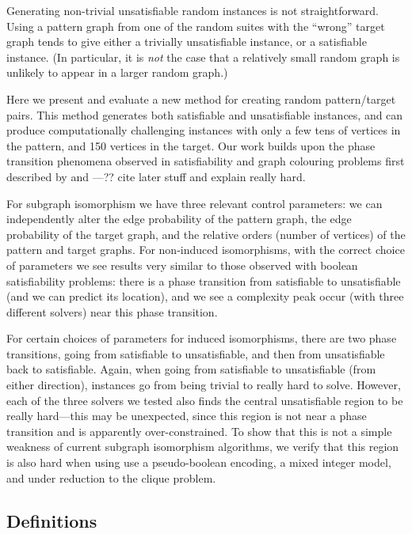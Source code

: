 \documentclass[letterpaper]{article}
\begin{document}
Generating non-trivial unsatisfiable random instances is not straightforward. Using a
pattern graph from one of the random suites with the ``wrong'' target graph tends to give either a
trivially unsatisfiable instance, or a satisfiable instance. (In particular, it is \emph{not} the
case that a relatively small random graph is unlikely to appear in a larger random graph.)

Here we present and evaluate a new method for creating random pattern/target pairs. This method
generates both satisfiable and unsatisfiable instances, and can produce computationally challenging
instances with only a few tens of vertices in the pattern, and 150 vertices in the target. Our work
builds upon the phase transition phenomena observed in satisfiability and graph colouring problems
first described by \citet{Cheeseman:1991} and \citet{Mitchell:1992}---?? cite later stuff and
explain really hard.

For subgraph isomorphism we have three relevant control parameters: we can independently alter the
edge probability of the pattern graph, the edge probability of the target graph, and the relative
orders (number of vertices) of the pattern and target graphs.  For non-induced isomorphisms, with
the correct choice of parameters we see results very similar to those observed with boolean
satisfiability problems: there is a phase transition from satisfiable to unsatisfiable (and we can
predict its location), and we see a complexity peak occur (with three different solvers) near this
phase transition.

For certain choices of parameters for induced isomorphisms, there are two phase transitions, going
from satisfiable to unsatisfiable, and then from unsatisfiable back to satisfiable. Again, when
going from satisfiable to unsatisfiable (from either direction), instances go from being trivial to
really hard to solve. However, each of the three solvers we tested also finds the central
unsatisfiable region to be really hard---this may be unexpected, since this region is not near a
phase transition and is apparently over-constrained. To show that this is not a simple weakness of
current subgraph isomorphism algorithms, we verify that this region is also hard when using use a
pseudo-boolean encoding, a mixed integer model, and under reduction to the clique problem.

\subsection{Definitions}
\end{document}
